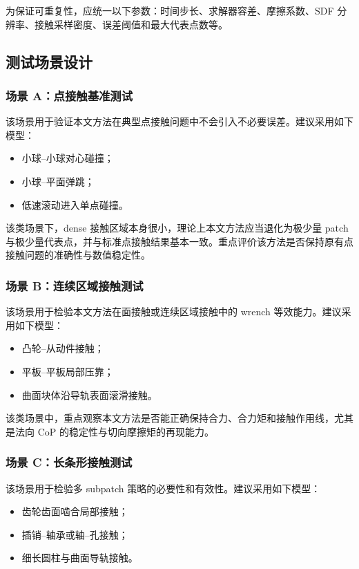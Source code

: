 为保证可重复性，应统一以下参数：时间步长、求解器容差、摩擦系数、SDF 分辨率、接触采样密度、误差阈值和最大代表点数等。

\subsection{测试场景设计}

\subsubsection{场景 A：点接触基准测试}

该场景用于验证本文方法在典型点接触问题中不会引入不必要误差。建议采用如下模型：
\begin{itemize}[leftmargin=2em]
    \item 小球--小球对心碰撞；
    \item 小球--平面弹跳；
    \item 低速滚动进入单点碰撞。
\end{itemize}

该类场景下，dense 接触区域本身很小，理论上本文方法应当退化为极少量 patch 与极少量代表点，并与标准点接触结果基本一致。重点评价该方法是否保持原有点接触问题的准确性与数值稳定性。

\subsubsection{场景 B：连续区域接触测试}

该场景用于检验本文方法在面接触或连续区域接触中的 wrench 等效能力。建议采用如下模型：
\begin{itemize}[leftmargin=2em]
    \item 凸轮--从动件接触；
    \item 平板--平板局部压靠；
    \item 曲面块体沿导轨表面滚滑接触。
\end{itemize}

该类场景中，重点观察本文方法是否能正确保持合力、合力矩和接触作用线，尤其是法向 CoP 的稳定性与切向摩擦矩的再现能力。

\subsubsection{场景 C：长条形接触测试}

该场景用于检验多 subpatch 策略的必要性和有效性。建议采用如下模型：
\begin{itemize}[leftmargin=2em]
    \item 齿轮齿面啮合局部接触；
    \item 插销--轴承或轴--孔接触；
    \item 细长圆柱与曲面导轨接触。
\end{itemize}

